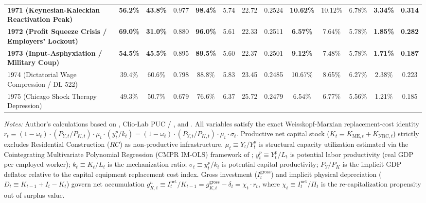 \begin{table}[htbp]
{\begin{tabular}{lcccccccccccc}
\textbf{1971 (Keynesian-Kaleckian Reactivation Peak)} & \textbf{56.2\%} & \textbf{43.8\%} & 0.977 & \textbf{98.4\%} & 5.74 & 22.72 & 0.2524 & \textbf{10.62\%} & 10.12\% & 6.78\% & \textbf{3.34\%} & \textbf{0.314} \\
\textbf{1972 (Profit Squeeze Crisis / Employers' Lockout)} & \textbf{69.0\%} & \textbf{31.0\%} & 0.880 & \textbf{96.0\%} & 5.61 & 22.33 & 0.2511 & \textbf{6.57\%} & 7.64\% & 5.78\% & \textbf{1.85\%} & \textbf{0.282} \\
\textbf{1973 (Input-Asphyxiation / Military Coup)} & \textbf{54.5\%} & \textbf{45.5\%} & 0.895 & \textbf{89.5\%} & 5.60 & 22.37 & 0.2501 & \textbf{9.12\%} & 7.48\% & 5.78\% & \textbf{1.71\%} & \textbf{0.187} \\
1974 (Dictatorial Wage Compression / DL 522) & 39.4\% & 60.6\% & 0.798 & 88.8\% & 5.83 & 23.45 & 0.2485 & 10.67\% & 8.65\% & 6.27\% & 2.38\% & 0.223 \\
1975 (Chicago Shock Therapy Depression) & 49.3\% & 50.7\% & 0.679 & 76.6\% & 6.37 & 25.72 & 0.2479 & 6.54\% & 6.77\% & 5.56\% & 1.21\% & 0.185 \\
\bottomrule
\end{tabular}%
}
\begin{minipage}{0.98\textwidth}
\vspace{0.4em}
\footnotesize
\textit{Notes:} Author's calculations based on \citet{Astorga2023}, Clio-Lab PUC / \citet{DiazLudersWagner2016}, and \citet{Polanco2026}. All variables satisfy the exact Weisskopf-Marxian replacement-cost identity $r_t \equiv (1 - \omega_t) \cdot (P_{Y, t} / P_{K, t}) \cdot \mu_t \cdot (y^p_t / k_t) = (1 - \omega_t) \cdot (P_{Y, t} / P_{K, t}) \cdot \mu_t \cdot \sigma_t$. Productive net capital stock ($K_t \equiv K_{\text{ME}, t} + K_{\text{NRC}, t}$) strictly excludes Residential Construction ($RC$) as non-productive infrastructure. $\mu_t \equiv Y_t / Y^p_t$ is structural capacity utilization estimated via the Cointegrating Multivariate Polynomial Regression (CMPR IM-OLS) framework of \citet{Polanco2026}; $y^p_t \equiv Y^p_t / L_t$ is potential labor productivity (real GDP per employed worker); $k_t \equiv K_t / L_t$ is the mechanization ratio; $\sigma_t \equiv y^p_t / k_t$ is potential capital productivity; $P_Y / P_K$ is the implicit GDP deflator relative to the capital equipment replacement cost index. Gross investment ($I^{\text{gross}}_t$) and implicit physical depreciation ($D_t \equiv K_{t-1} + I_t - K_t$) govern net accumulation $g^n_{K, t} \equiv I^{\text{net}}_t / K_{t-1} = g^{\text{gross}}_{K, t} - \delta_t = \chi_t \cdot r_t$, where $\chi_t \equiv I^{\text{net}}_t / \Pi_t$ is the re-capitalization propensity out of surplus value.
\end{minipage}
\end{table}
